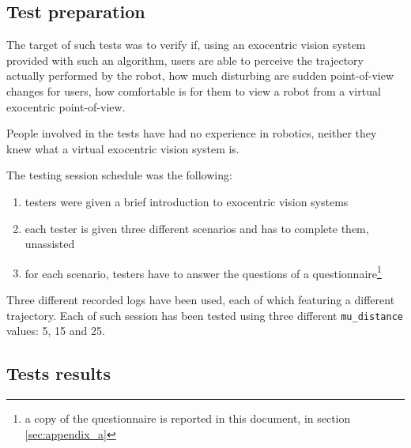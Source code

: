 \subsection{Test preparation}
\label{subsec:testpreparation}
%
The target of such tests was to verify  if, using 
an exocentric vision system provided with such an algorithm, 
users are able to perceive the trajectory actually 
performed by the robot,  how much disturbing are 
sudden point-of-view changes for users,  how 
comfortable is for them to view a robot from a 
virtual exocentric point-of-view.
%

%
People involved in the tests have had no experience in 
robotics, neither they knew what a virtual exocentric 
vision system is.
%

%
The testing session schedule was the following:
\begin{enumerate}
  \item testers were given a brief introduction to exocentric vision systems
  \item each tester is given three different scenarios and has to 
    complete them, unassisted
  \item for each scenario, testers have to answer the questions 
    of a questionnaire\footnote{a copy of the questionnaire is 
      reported in this document, in section \ref{sec:appendix_a}}
\end{enumerate}
%

%
Three different recorded logs have been used, each of which featuring 
a different trajectory. Each of such session has been tested
using three different \texttt{mu\_distance} values: 5, 15 and 25. 
%
\subsection{Tests results}
\label{subsec:tests_result}
